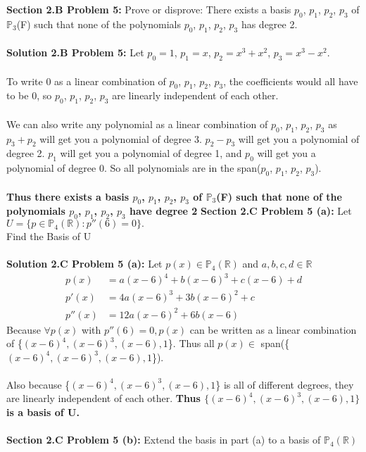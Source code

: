 \documentclass[12pt]{article}
\begin{document}
\noindent \textbf{Section 2.B Problem 5: } Prove or disprove: There exists a basis $p_0$, $p_1$, $p_2$, $p_3$ of $\mathbb{P}_3$(F) such that none of the polynomials $p_0$, $p_1$, $p_2$, $p_3$ has degree 2.
\\\\
\noindent \textbf{Solution 2.B Problem 5: } Let $p_0 = 1$, $p_1 = x$, $p_2 = x^3 + x^2$, $p_3 = x^3 - x^2$. 
\\\\
To write 0 as a linear combination of $p_0$, $p_1$, $p_2$, $p_3$, the coefficients would all have to be 0, so $p_0$, $p_1$, $p_2$, $p_3$ are linearly independent of each other.
\\\\
We can also write any polynomial as a linear combination of $p_0$, $p_1$, $p_2$, $p_3$ as $p_3 + p_2$ will get you a polynomial of degree 3.  $p_2 - p_3$ will get you a polynomial of degree 2.  $p_1$ will get you a polynomial of degree 1, and $p_0$ will get you a polynomial of degree 0. So all polynomials are in the span($p_0$, $p_1$, $p_2$, $p_3$).  
\\\\
\textbf{\boldmath Thus there exists a basis $p_0$, $p_1$, $p_2$, $p_3$ of $\mathbb{P}_3$(F) such that none of the polynomials $p_0$, $p_1$, $p_2$, $p_3$ have degree 2}
\newpage
\noindent \textbf{Section 2.C Problem 5 (a): }Let $U = \{ p \in \mathbb{P}_4(\mathbb{R}) : p''(6) = 0\}.$ \\Find the Basis of U
\\\\
\noindent \textbf{Solution 2.C Problem 5 (a): } Let $p(x) \in \mathbb{P}_4(\mathbb{R})$ and $a,b,c,d \in \mathbb{R}$
	\begin{align}
		p(x) &= a(x-6)^4 + b(x-6)^3 + c(x-6) + d \\
		p'(x) &= 4a(x-6)^3 + 3b(x-6)^2 + c \\
		p''(x) &= 12a(x-6)^2 + 6b(x-6)
	\end{align}
Because $\forall p(x)$ with $p''(6) = 0, p(x)$ can be written as a linear combination of \{$(x-6)^4, (x-6)^3, (x-6), 1$\}.  Thus all $p(x) \in$ span(\{$(x-6)^4, (x-6)^3, (x-6), 1$\}).  
\\\\
Also because \{$(x-6)^4, (x-6)^3, (x-6), 1$\} is all of different degrees, they are linearly independent of each other. \textbf{\boldmath Thus $\{(x-6)^4, (x-6)^3, (x-6), 1\}$ is a basis of U.}
\\\\
\noindent \textbf{Section 2.C Problem 5 (b): } Extend the basis in part (a) to a basis of $\mathbb{P}_4(\mathbb{R})$
\end{document}
